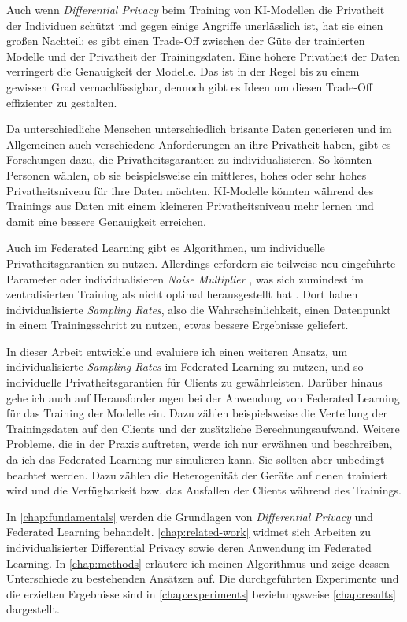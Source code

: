 Auch wenn \textit{Differential Privacy} beim Training von KI-Modellen die Privatheit der Individuen schützt und gegen einige Angriffe unerlässlich ist, hat sie einen großen Nachteil: es gibt einen Trade-Off zwischen der Güte der trainierten Modelle und der Privatheit der Trainingsdaten. Eine höhere Privatheit der Daten verringert die Genauigkeit der Modelle. Das ist in der Regel bis zu einem gewissen Grad vernachlässigbar, dennoch gibt es Ideen um diesen Trade-Off effizienter zu gestalten. 

Da unterschiedliche Menschen unterschiedlich brisante Daten generieren und im Allgemeinen auch verschiedene Anforderungen an ihre Privatheit haben, gibt es Forschungen dazu, die Privatheitsgarantien zu individualisieren. So könnten Personen wählen, ob sie beispielsweise ein mittleres, hohes oder sehr hohes Privatheitsniveau für ihre Daten möchten. KI-Modelle könnten während des Trainings aus Daten mit einem kleineren Privatheitsniveau mehr lernen und damit eine bessere Genauigkeit erreichen.

Auch im Federated Learning gibt es Algorithmen, um individuelle Privatheitsgarantien zu nutzen. Allerdings erfordern sie teilweise neu eingeführte Parameter \parencite{shen:2023} oder individualisieren \textit{Noise Multiplier} \parencite{aldaghri:2023}, was sich zumindest im zentralisierten Training als nicht optimal herausgestellt hat \parencite{boenisch:2023}. Dort haben individualisierte \textit{Sampling Rates}, also die Wahrscheinlichkeit, einen Datenpunkt in einem Trainingsschritt zu nutzen, etwas bessere Ergebnisse geliefert.

In dieser Arbeit entwickle und evaluiere ich einen weiteren Ansatz, um individualisierte \textit{Sampling Rates} im Federated Learning zu nutzen, und so individuelle Privatheitsgarantien für Clients zu gewährleisten. Darüber hinaus gehe ich auch auf Herausforderungen bei der Anwendung von Federated Learning für das Training der Modelle ein. Dazu zählen beispielsweise die Verteilung der Trainingsdaten auf den Clients und der zusätzliche Berechnungsaufwand. Weitere Probleme, die in der Praxis auftreten, werde ich nur erwähnen und beschreiben, da ich das Federated Learning nur simulieren kann. Sie sollten aber unbedingt beachtet werden. Dazu zählen die Heterogenität der Geräte auf denen trainiert wird und die Verfügbarkeit bzw. das Ausfallen der Clients während des Trainings.

In \autoref{chap:fundamentals} werden die Grundlagen von \textit{Differential Privacy} und Federated Learning behandelt. \autoref{chap:related-work} widmet sich Arbeiten zu individualisierter Differential Privacy sowie deren Anwendung im Federated Learning. In \autoref{chap:methods} erläutere ich meinen Algorithmus und zeige dessen Unterschiede zu bestehenden Ansätzen auf. Die durchgeführten Experimente und die erzielten Ergebnisse sind in \autoref{chap:experiments} beziehungsweise \autoref{chap:results} dargestellt.